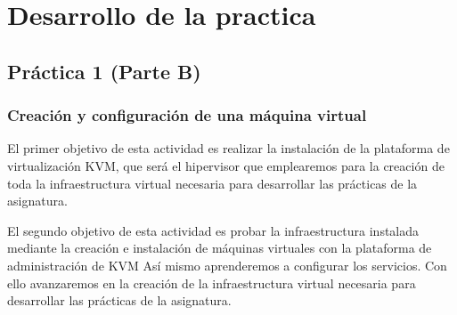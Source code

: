 \chapter{Desarrollo de la practica} %

\section{Práctica 1 (Parte B)}
\subsection{Creación y configuración de	 una máquina virtual }
El primer objetivo de esta actividad es realizar la instalación de la plataforma de virtualización KVM, que será el hipervisor que emplearemos para la creación de toda la infraestructura virtual necesaria para desarrollar las prácticas de la asignatura.

El segundo objetivo de esta actividad es probar la infraestructura instalada mediante la creación e instalación de máquinas virtuales con la plataforma de administración de KVM
Así mismo aprenderemos a configurar los servicios. Con ello avanzaremos en la creación de la infraestructura virtual necesaria para desarrollar las prácticas de la asignatura.

